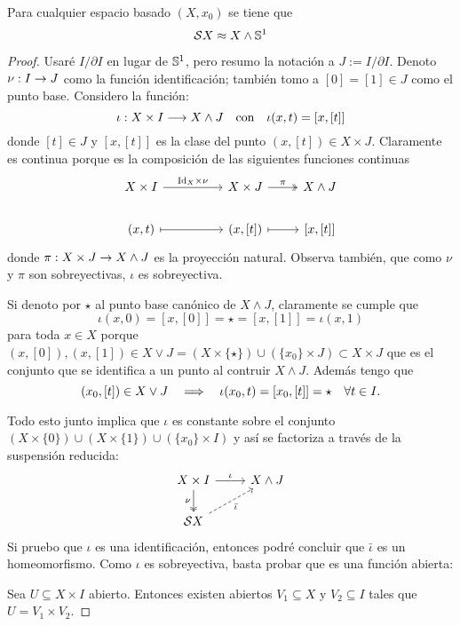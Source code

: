 
\begin{ejercicio}\label{ej:9}
Para cualquier espacio basado $(X,x_0)$ se tiene que
\[
	\mathcal{S} X \approx X\wedge\mathbb{S}^1
\]
\end{ejercicio}

\begin{proof}%

Usar\'e $I/\partial I$ en lugar de $\mathbb{S}^1$, pero resumo la notaci\'on a $J:=I/\partial I$.
Denoto $\nu:I\rightarrow J$ como la funci\'on identificaci\'on; tambi\'en tomo a $[0]=[1]\in J$
como el punto base. Considero la funci\'on:
\[
	\iota:X\times I \longrightarrow X\wedge J \quad\text{con}\quad \iota(x,t)=[x,[t]]
\]
donde $[t]\in J$ y $[x,[t]]$ es la clase del punto $(x,[t])\in X\times J$. Claramente es
continua porque es la composici\'on de las siguientes funciones continuas
\[
\begin{tikzcd}
	X\times I \arrow[rr,"\Id_X\times \nu"] & & X\times J \arrow[r,twoheadrightarrow,"\pi"] & X \wedge J \\
	(x,t) \arrow[rr,mapsto] & & (x,[t]) \arrow[r,mapsto] & \text{[}x,\text{[}t\text{]}\text{]}
\end{tikzcd}
\]
donde $\pi:X\times J \rightarrow X\wedge J$ es la proyecci\'on natural. Observa tambi\'en, que como $\nu$
y $\pi$ son sobreyectivas, $\iota$ es sobreyectiva.

Si denoto por $\star$ al punto base can\'onico de $X\wedge J$, claramente se cumple que
\[
	\iota(x,0)=[x,[0]]=\star=[x,[1]]=\iota(x,1)
\]
para toda $x\in X$ porque $(x,[0]),(x,[1])\in X\vee J = (X\times\{\star\})\cup(\{x_0\}\times J)\subset X\times J$
que es el conjunto que se identifica a un punto al contruir $X\wedge J$. Adem\'as tengo que
\[
	(x_0,[t])\in X\vee J \quad\Longrightarrow\quad \iota(x_0,t)=[x_0,[t]]=\star \quad\forall t\in I.
\]

Todo esto junto implica que $\iota$ es constante sobre el conjunto
$(X\times\{0\})\cup(X\times\{1\})\cup(\{x_0\}\times I)$ y as\'i se factoriza a trav\'es de la 
suspensi\'on reducida:
\[
\begin{tikzcd}
	X\times I \arrow[d,twoheadrightarrow,"\nu"'] \arrow[r,"\iota"] & X\wedge J \\
	\Ss X \arrow[ur,dashed,"\bar{\iota}"'] &
\end{tikzcd}
\]
Si pruebo que $\iota$ es una identificaci\'on, entonces podr\'e concluir que $\bar{\iota}$ es un homeomorfismo.
Como $\iota$ es sobreyectiva, basta probar que es una funci\'on abierta:

Sea $U\subseteq X\times I$ abierto. Entonces existen abiertos $V_1\subseteq X$ y $V_2\subseteq I$ tales que
$U=V_1\times V_2$.

\end{proof}%

